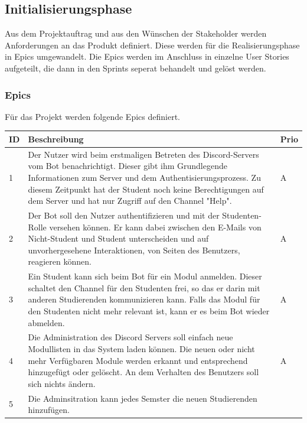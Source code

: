 \documentclass[a4paper, table]{article}
\begin{document}
\subsection{Initialisierungsphase}
Aus dem Projektauftrag und aus den Wünschen der Stakeholder werden Anforderungen an das Produkt definiert.
Diese werden für die Realisierungsphase in Epics umgewandelt.
Die Epics werden im Anschluss in einzelne User Stories aufgeteilt, die dann in den Sprints seperat behandelt und gelöst werden.

\subsubsection{Epics}\label{Epics}
Für das Projekt werden folgende Epics definiert.

\begin{table}[h]
    \centering
    \begin{tabular}{ | p{1em} | p{35em} | p{2em} |}
        \hline
        \rowcolor[gray]{.9} ID & Beschreibung & Prio \\
        \hline
        1 & Der Nutzer wird beim erstmaligen Betreten des Discord-Servers vom Bot benachrichtigt.
        Dieser gibt ihm Grundlegende Informationen zum Server und dem Authentisierungsprozess.
        Zu diesem Zeitpunkt hat der Student noch keine Berechtigungen auf dem Server und
        hat nur Zugriff auf den Channel "Help". & A \\
        \hline
        2 & Der Bot soll den Nutzer authentifizieren und mit der Studenten-Rolle versehen können.
        Er kann dabei zwischen den E-Mails von Nicht-Student und Student unterscheiden und auf unvorhergesehene
        Interaktionen, von Seiten des Benutzers, reagieren können. & A \\
        \hline
        3 & Ein Student kann sich beim Bot für ein Modul anmelden. Dieser schaltet den Channel für den Studenten frei,
        so das er darin mit anderen Studierenden kommunizieren kann. Falls das Modul für den Studenten nicht mehr relevant ist,
        kann er es beim Bot wieder abmelden. & A \\
        \hline
        4 & Die Administration des Discord Servers soll einfach neue Modullisten in das System laden können.
        Die neuen oder nicht mehr Verfügbaren Module werden erkannt und entsprechend hinzugefügt oder gelöscht.
        An dem Verhalten des Benutzers soll sich nichts ändern. & A \\
        \hline
        5 & Die Adminsitration kann jedes Semster die neuen Studierenden hinzufügen.

\end{tabular}
\end{table}
\end{document}
